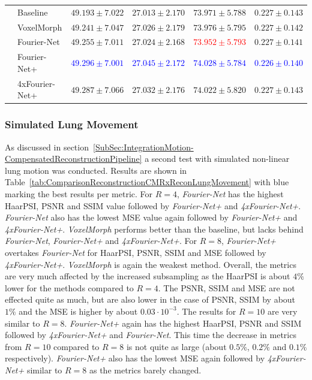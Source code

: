\begin{table}[H]
\begin{tabularx}{\textwidth}{c Y Y Y Y Y}
		\midrule		
		 & Baseline & $49.193 \pm 7.022$ & $27.013 \pm 2.170$ & $73.971 \pm 5.788$ & $0.227 \pm 0.143$ \\  
		 & VoxelMorph & $49.241 \pm 7.047$ & $27.026 \pm 2.179$ & $73.976 \pm 5.795$ & $0.227 \pm 0.142$ \\  
		 & Fourier-Net & $49.255 \pm 7.011$ & $27.024 \pm 2.168$ & \textcolor{red}{$73.952 \pm 5.793$} & $0.227 \pm 0.141$ \\  
		 & Fourier-Net+ & \textcolor{blue}{$49.296 \pm 7.001$} & \textcolor{blue}{$27.045 \pm 2.172$} & \textcolor{blue}{$74.028 \pm 5.784$} & \textcolor{blue}{$0.226 \pm 0.140$} \\   
		 & \mbox{4xFourier-Net+} & $49.287 \pm 7.066$ & $27.032 \pm 2.176$ & $74.022 \pm 5.820$ & $0.227 \pm 0.143$ \\ 
		 \bottomrule
	\end{tabularx}
\end{table}


\subsubsection{Simulated Lung Movement} \label{SubSubSec:ResultsLungMovement}
As discussed in section~\ref{SubSec:IntegrationMotion-CompensatedReconstructionPipeline} a second test with simulated non-linear lung motion was conducted. Results are shown in Table~\ref{tab:ComparisonReconstructionCMRxReconLungMovement} with blue marking the best results per metric. For $R=4$, \emph{Fourier-Net} has the highest HaarPSI, PSNR and SSIM value followed by \emph{Fourier-Net+} and \emph{4xFourier-Net+}. \emph{Fourier-Net} also has the lowest MSE value again followed by \emph{Fourier-Net+} and \emph{4xFourier-Net+}. \emph{VoxelMorph} performs better than the baseline, but lacks behind \emph{Fourier-Net}, \emph{Fourier-Net+} and \emph{4xFourier-Net+}. For $R=8$, \emph{Fourier-Net+} overtakes \emph{Fourier-Net} for HaarPSI, PSNR, SSIM and MSE followed by \emph{4xFourier-Net+}. \emph{VoxelMorph} is again the weakest method. Overall, the metrics are very much affected by the increased subsampling as the HaarPSI is about $4 \%$ lower for the methods compared to $R=4$. The PSNR, SSIM and MSE are not effected quite as much, but are also lower in the case of PSNR, SSIM by about $1 \%$ and the MSE is higher by about $0.03 \cdot 10^{-3}$. The results for $R=10$ are very similar to $R=8$. \emph{Fourier-Net+} again has the highest HaarPSI, PSNR and SSIM followed by \emph{4xFourier-Net+} and \emph{Fourier-Net}. This time the decrease in metrics from $R=10$ compared to $R=8$ is not quite as large (about $0.5 \%$, $0.2 \%$ and $0.1 \%$ respectively). \emph{Fourier-Net+} also has the lowest MSE again followed by \emph{4xFourier-Net+} similar to $R=8$ as the metrics barely changed.

